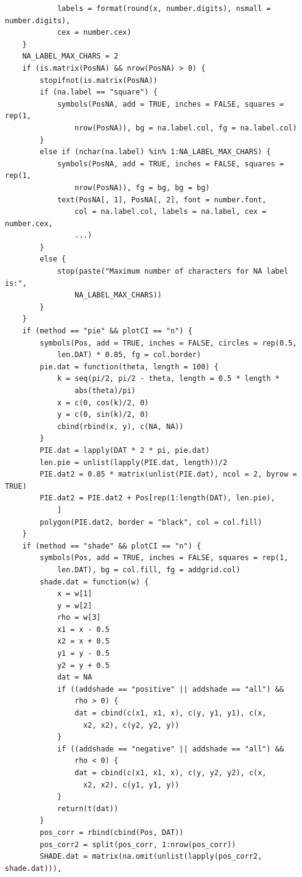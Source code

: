 \documentclass[
]{article}
\begin{document}
\begin{verbatim}
            labels = format(round(x, number.digits), nsmall = number.digits), 
            cex = number.cex)
    }
    NA_LABEL_MAX_CHARS = 2
    if (is.matrix(PosNA) && nrow(PosNA) > 0) {
        stopifnot(is.matrix(PosNA))
        if (na.label == "square") {
            symbols(PosNA, add = TRUE, inches = FALSE, squares = rep(1, 
                nrow(PosNA)), bg = na.label.col, fg = na.label.col)
        }
        else if (nchar(na.label) %in% 1:NA_LABEL_MAX_CHARS) {
            symbols(PosNA, add = TRUE, inches = FALSE, squares = rep(1, 
                nrow(PosNA)), fg = bg, bg = bg)
            text(PosNA[, 1], PosNA[, 2], font = number.font, 
                col = na.label.col, labels = na.label, cex = number.cex, 
                ...)
        }
        else {
            stop(paste("Maximum number of characters for NA label is:", 
                NA_LABEL_MAX_CHARS))
        }
    }
    if (method == "pie" && plotCI == "n") {
        symbols(Pos, add = TRUE, inches = FALSE, circles = rep(0.5, 
            len.DAT) * 0.85, fg = col.border)
        pie.dat = function(theta, length = 100) {
            k = seq(pi/2, pi/2 - theta, length = 0.5 * length * 
                abs(theta)/pi)
            x = c(0, cos(k)/2, 0)
            y = c(0, sin(k)/2, 0)
            cbind(rbind(x, y), c(NA, NA))
        }
        PIE.dat = lapply(DAT * 2 * pi, pie.dat)
        len.pie = unlist(lapply(PIE.dat, length))/2
        PIE.dat2 = 0.85 * matrix(unlist(PIE.dat), ncol = 2, byrow = TRUE)
        PIE.dat2 = PIE.dat2 + Pos[rep(1:length(DAT), len.pie), 
            ]
        polygon(PIE.dat2, border = "black", col = col.fill)
    }
    if (method == "shade" && plotCI == "n") {
        symbols(Pos, add = TRUE, inches = FALSE, squares = rep(1, 
            len.DAT), bg = col.fill, fg = addgrid.col)
        shade.dat = function(w) {
            x = w[1]
            y = w[2]
            rho = w[3]
            x1 = x - 0.5
            x2 = x + 0.5
            y1 = y - 0.5
            y2 = y + 0.5
            dat = NA
            if ((addshade == "positive" || addshade == "all") && 
                rho > 0) {
                dat = cbind(c(x1, x1, x), c(y, y1, y1), c(x, 
                  x2, x2), c(y2, y2, y))
            }
            if ((addshade == "negative" || addshade == "all") && 
                rho < 0) {
                dat = cbind(c(x1, x1, x), c(y, y2, y2), c(x, 
                  x2, x2), c(y1, y1, y))
            }
            return(t(dat))
        }
        pos_corr = rbind(cbind(Pos, DAT))
        pos_corr2 = split(pos_corr, 1:nrow(pos_corr))
        SHADE.dat = matrix(na.omit(unlist(lapply(pos_corr2, shade.dat))), 

\end{verbatim}
\end{document}
